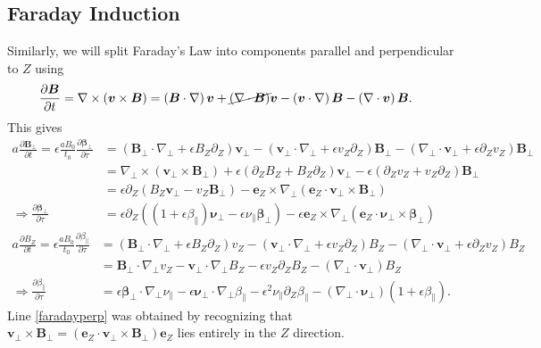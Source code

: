 \documentclass{article}
\newcommand{\para}{\parallel}
\newcommand{\ep}{\epsilon}
\newcommand{\np}{\nabla_\perp}
\newcommand{\p}{\partial}
\newcommand{\deriv}[2]{\frac{\p #1}{\p #2}}
\newcommand{\pth} [1] {\left( #1 \right) }
\begin{document}
\subsection{Faraday Induction}
Similarly, we will split Faraday's Law into components parallel and perpendicular to $Z$ using
\begin{align*}
    \deriv{\bm{B}}{t} &= \nabla\times\pth{\bm{v}\times\bm{B}} = \pth{\bm{B}\cdot\nabla} \bm{v} + \cancel{\pth{\nabla\cdot\bm{B}}} \bm{v} - \pth{\bm{v}\cdot\nabla} \bm{B} - \pth{\nabla\cdot\bm{v}} \bm{B}.
\end{align*}
This gives
\begin{align}\label{faradayperp}
a\deriv{\bm{B}_\perp}{t} = \ep\frac{aB_0}{t_0} \deriv{\bm{\beta}_\perp}{\tau} 
    &= \pth{\bm{B}_\perp\cdot\np + \ep B_Z\p_Z}\bm{v}_\perp - \pth{\bm{v}_\perp\cdot\np + \ep v_Z\p_Z}\bm{B}_\perp - \pth{\np\cdot\bm{v}_\perp + \ep \p_Zv_Z}\bm{B}_\perp \nonumber\\ 
    &= \np\times\pth{\bm{v}_\perp\times\bm{B}_\perp} + \ep\pth{\p_ZB_Z + B_Z\p_Z}\bm{v}_\perp - \ep\pth{\p_Zv_Z + v_Z\p_Z}\bm{B}_\perp \nonumber\\ 
    &= \ep\p_Z\pth{B_Z\bm{v}_\perp - v_Z\bm{B}_\perp} - \bm{e}_Z\times\np\pth{\bm{e}_Z\cdot\bm{v}_\perp\times\bm{B}_\perp} \\
    \Longrightarrow \deriv{\bm{\beta}_\perp}{\tau} &= \ep\p_Z\pth{\pth{1+\ep\beta_\para}\bm{\nu}_\perp - \ep\nu_\para\bm{\beta}_\perp} - \ep\bm{e}_Z\times\np\pth{\bm{e}_Z\cdot\bm{\nu}_\perp\times\bm{\beta}_\perp}
\end{align}
\begin{align} \label{faradaypara}
a\deriv{B_Z}{t} = \ep \frac{aB_0}{t_0} \deriv{\beta_\para}{\tau} &= 
    \pth{\bm{B}_\perp\cdot\np + \ep B_Z\p_Z}v_Z - \pth{\bm{v}_\perp\cdot\np + \ep v_Z\p_Z} B_Z - \pth{\np\cdot\bm{v}_\perp + \ep \p_Zv_Z} B_Z \nonumber \\
    &= \bm{B}_\perp\cdot\np v_Z - \bm{v}_\perp\cdot\np B_Z - \ep v_Z\p_ZB_Z - \pth{\np\cdot\bm{v}_\perp} B_Z \nonumber \\ 
    \Longrightarrow \deriv{\beta_\para}{\tau} &= \ep\bm{\beta}_\perp\cdot\np\nu_\para - \ep \bm{\nu}_\perp \cdot\np\beta_\para - \ep^2 \nu_\para\p_Z\beta_\para - \pth{\np\cdot\bm{\nu}_\perp} \pth{1+\ep\beta_\para}.
\end{align}
Line \eqref{faradayperp} was obtained by recognizing that $\bm{v}_\perp\times\bm{B}_\perp = \pth{\bm{e}_Z\cdot\bm{v}_\perp\times\bm{B}_\perp}\bm{e}_Z$ lies entirely in the $Z$ direction. 
\end{document}
